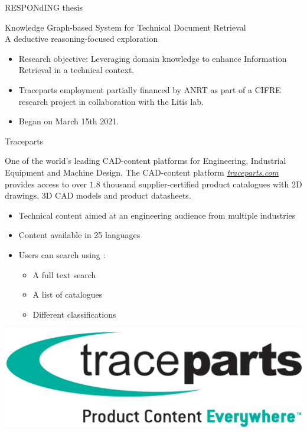 \begin{frame}{RESPONdING thesis}
    \begin{center}
        Knowledge Graph-based System for Technical Document Retrieval\\A deductive reasoning-focused exploration
    \end{center}
    
    \begin{itemize}
        \item Research objective: Leveraging domain knowledge to enhance Information Retrieval in a technical context.
        \item Traceparts employment partially financed by ANRT as part of a CIFRE research project in collaboration with the Litis lab. 
        \item Began on March 15th 2021.
    \end{itemize}
    
\end{frame}

\begin{frame}{Traceparts}

    \begin{center}
        One of the world's leading CAD-content platforms for Engineering, Industrial Equipment and Machine Design. The CAD-content platform \emph{\href{http://traceparts.com/}{traceparts.com}} provides access to over $1.8$ thousand supplier-certified product catalogues with 2D drawings, 3D CAD models and product datasheets.
    \end{center}

    \begin{itemize}
        \item Technical content aimed at an engineering audience from multiple industries
        \item Content available in 25 languages
        \item Users can search using :
        \begin{itemize}
            \item A full text search
            \item A list of catalogues
            \item Different classifications
        \end{itemize}
    \end{itemize}
    
    \begin{center}
        \includegraphics[scale=0.1]{images/traceparts_logo.png}
    \end{center}
    
\end{frame}